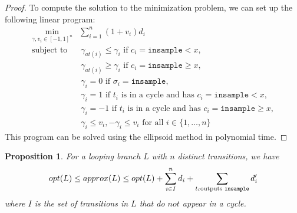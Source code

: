 \documentclass[12pt]{article}
\newcommand{\gguard}[1][x]{\texttt{insample}\geq#1}
\newcommand{\lguard}[1][x]{\texttt{insample} < #1}
\newtheorem{prop}[thm]{Proposition}
\theoremstyle{definition}
\begin{document}
\begin{proof}
    To compute the solution to the minimization problem, we can set up the following linear program: 
    \begin{align*}
        \min_{\gamma, v_i \in [-1, 1]^n} &\sum_{i = 1}^n \left(1 + v_i \right) d_i \\ 
            \text{subject to } 
            &\ \gamma_{at(i)} \leq \gamma_i \text{ if } c_i = \lguard, \\
            &\ \gamma_{at(i)} \geq \gamma_i \text{ if } c_i = \gguard, \\
            &\ \gamma_i = 0 \text{ if } \sigma_i = \texttt{insample}, \\
            &\ \gamma_i = 1 \text{ if } t_i \text{ is in a cycle and has } c_i = \lguard,\\ 
            &\ \gamma_i = -1 \text{ if } t_i \text{ is in a cycle and has } c_i = \gguard,\\
            &\ \gamma_i \leq v_i, -\gamma_i \leq v_i \text{ for all } i \in \{1, \dots, n\} 
    \end{align*}
    This program can be solved using the ellipsoid method in polynomial time.
\end{proof}

\begin{prop}
    For a looping branch $L$ with $n$ distinct transitions, we have 
    \[opt(L) \leq approx(L) \leq opt(L) + \sum_{i \in I }^n d_i + \sum_{t_i \text{outputs \texttt{insample}}} d_i'\]
    where $I$ is the set of transitions in $L$ that do $\textit{not}$ appear in a cycle.
\end{prop}
\end{document}
